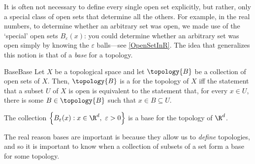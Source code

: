 It is often not necessary to define every single open set explicitly, but rather, only a special class of open sets that determine all the others.  For example, in the real numbers, to determine whether an arbitrary set was open, we made use of the `special' open sets $B_\varepsilon (x)$:  you could determine whether an arbitrary set was open simply by knowing the $\varepsilon$ balls---see \cref{OpenSetInR}.  The idea that generalizes this notion is that of a \emph{base} for a topology.
\begin{dfn}{Base}{Base}
Let $X$ be a topological space and let $\topology{B}$ be a collection of open sets of $X$.  Then, $\topology{B}$ is a  for the topology of $X$ iff the statement that a subset $U$ of $X$ is open is equivalent to the statement that, for every $x\in U$, there is some $B\in \topology{B}$ such that $x\in B\subseteq U$.
\end{dfn}
\begin{exm}{}{}
The collection $\left\{ B_\varepsilon (x):x\in \R ^d,\ \varepsilon >0\right\}$ is a base for the topology of $\R ^d$.
\end{exm}
The real reason bases are important is because they allow us to \emph{define} topologies, and so it is important to know when a collection of subsets of a set form a base for some topology.
